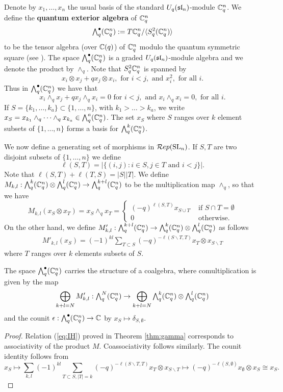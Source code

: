 \documentclass[11pt]{amsart}
\begin{document}
Denote by $ x_1, \dots, x_n $ the usual basis of the standard $U_q(\sl_n)$-module $\bC_q^n $. We define the {\bf quantum exterior algebra} of $ \bC_q^n $
$$  \Alt{\bullet}{q}(\bC_q^n) := T \bC_q^n / \langle S^2_q ( \bC_q^n) \rangle $$
to be the tensor algebra (over $\bC(q) $) of $ \bC_q^n $ modulo the quantum symmetric square (see \cite{BZ}). The space $ \Alt{\bullet}{q}(\bC_q^n) $ is a graded $U_q(\sl_n)$-module algebra and we denote the product by $ \wedge_q $. Note that $S^2_q \bC_q^n $ is spanned by 
$$ x_i \otimes x_j + q x_j \otimes x_i, \text{ for }  i < j , \text{ and } x_i^2, \text{ for all } i. $$ 
Thus in $ \Alt{\bullet}{q}(\bC_q^n) $ we have that
$$ x_i \wedge_q x_j + q x_j \wedge_q x_i = 0 \text{ for }  i < j, \text{ and } x_i \wedge_q x_i = 0, \text{ for all }  i. $$
If $ S =\{k_1, \dots, k_a\} \subset \{1, \dots, n\} $, with $ k_1 > \dots > k_a $, we write $ x_S = x_{k_1} \wedge_q \cdots \wedge_q x_{k_a} \in \Alt{a}{q}(\bC_q^n) $. The set $ x_S $ where $ S $ ranges over $ k $ element subsets of $ \{1, \dots, n \} $ forms a basis for $ \Alt{k}{q}(\bC_q^n) $.


We now define a generating set of morphisms in $\Rep(\SL_n)$. If $S, T$ are two disjoint subsets of $ \{1, \dots, n\} $ we define $$ \ell(S, T) = |\{ (i,j) : i \in S, j \in T \text{ and } i < j \}|. $$ Note that $\ell(S,T) + \ell(T,S) = |S||T| $. We define $ M_{k,l} : \Alt{k}{q} (\bC^n_q) \otimes \Alt{l}{q}(\bC^n_q) \rightarrow \Alt{k+l}{q}(\bC^n_q) $ to be the multiplication map $ \wedge_q $, so that we have
\begin{equation*}
M_{k,l}(x_S \otimes x_T) = x_S \wedge_q x_T = \begin{cases} (-q)^{\ell(S, T)} x_{S \cup T} & \text{ if } S \cap T = \emptyset \\
 0 & \text{ otherwise. }
 \end{cases} 
\end{equation*}
On the other hand, we define $M'_{k,l} :\Alt{k+l}{q}(\bC^n_q) \rightarrow \Alt{k}{q} (\bC^n_q) \otimes \Alt{l}{q}(\bC^n_q) $ as follows 
\begin{align*}
M'_{k,l}(x_S) = (-1)^{kl} \sum_{T \subset S} (-q)^{-\ell(S \smallsetminus T, T)} x_T \otimes x_{S \smallsetminus T}
\end{align*}
where $ T $ ranges over $ k $ elements subsets of $ S $.

\begin{lem}
The space $\Alt{\bullet}{q}(\bC_q^n)$ carries the structure of a coalgebra, where comultiplication is given by the map 
$$\bigoplus_{k+l=N} M'_{k,l}: \Alt{N}{q}(\bC^n_q) \rightarrow \bigoplus_{k+l=N} \Alt{k}{q}(\bC^n_q) \otimes \Alt{l}{q}(\bC^n_q)$$ 
and the counit $\epsilon: \Alt{\bullet}{q}(\bC_q^n) \rightarrow \bC$ by $x_S \mapsto \delta_{S,\emptyset}$.
\end{lem}
\begin{proof}
Relation (\ref{eq:IH}) proved in Theorem \ref{thm:gamma} corresponds to associativity of the product $M$. Coassociativity follows similarly. The counit identity follows from
$$x_S \mapsto \sum_{k,l} (-1)^{kl} \sum_{T \subset S, |T|=k} (-q)^{-\ell(S \smallsetminus T,T)} x_T \otimes x_{S \smallsetminus T} \mapsto (-q)^{-\ell(S,\emptyset)} x_{\emptyset} \otimes x_S \cong x_S.$$
\end{proof}
\end{document}
